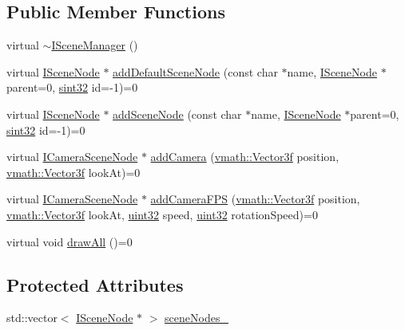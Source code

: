 \subsection*{Public Member Functions}
\begin{DoxyCompactItemize}
\item 
virtual \hyperlink{classicee_1_1engine_1_1ISceneManager_a0ce0427b8cfac77f1e520a5da7169a88}{$\sim$ISceneManager} ()
\item 
virtual \hyperlink{classicee_1_1engine_1_1ISceneNode}{ISceneNode} $\ast$ \hyperlink{classicee_1_1engine_1_1ISceneManager_afc84d5f887e850807ee36732b13c3798}{addDefaultSceneNode} (const char $\ast$name, \hyperlink{classicee_1_1engine_1_1ISceneNode}{ISceneNode} $\ast$parent=0, \hyperlink{namespacecompatibility_afc3ea6dfbdda98c9d2615b235b140a18}{sint32} id=-\/1)=0
\item 
virtual \hyperlink{classicee_1_1engine_1_1ISceneNode}{ISceneNode} $\ast$ \hyperlink{classicee_1_1engine_1_1ISceneManager_aecda2ddc8edc12f6bcf63575d988f0f1}{addSceneNode} (const char $\ast$name, \hyperlink{classicee_1_1engine_1_1ISceneNode}{ISceneNode} $\ast$parent=0, \hyperlink{namespacecompatibility_afc3ea6dfbdda98c9d2615b235b140a18}{sint32} id=-\/1)=0
\item 
virtual \hyperlink{classicee_1_1engine_1_1ICameraSceneNode}{ICameraSceneNode} $\ast$ \hyperlink{classicee_1_1engine_1_1ISceneManager_a2f43eae86d27ee9fd4d8964c7073cc9b}{addCamera} (\hyperlink{classvmath_1_1Vector3f}{vmath::Vector3f} position, \hyperlink{classvmath_1_1Vector3f}{vmath::Vector3f} lookAt)=0
\item 
virtual \hyperlink{classicee_1_1engine_1_1ICameraSceneNode}{ICameraSceneNode} $\ast$ \hyperlink{classicee_1_1engine_1_1ISceneManager_a2165f1d59e5338aa9fd89d0242a38662}{addCameraFPS} (\hyperlink{classvmath_1_1Vector3f}{vmath::Vector3f} position, \hyperlink{classvmath_1_1Vector3f}{vmath::Vector3f} lookAt, \hyperlink{namespacecompatibility_a51e8fe2956b4f39fe1fae96cec0d8393}{uint32} speed, \hyperlink{namespacecompatibility_a51e8fe2956b4f39fe1fae96cec0d8393}{uint32} rotationSpeed)=0
\item 
virtual void \hyperlink{classicee_1_1engine_1_1ISceneManager_a39930cf34881d0d014b41190dd356def}{drawAll} ()=0
\end{DoxyCompactItemize}
\subsection*{Protected Attributes}
\begin{DoxyCompactItemize}
\item 
std::vector$<$ \hyperlink{classicee_1_1engine_1_1ISceneNode}{ISceneNode} $\ast$ $>$ \hyperlink{classicee_1_1engine_1_1ISceneManager_abe2884dbf5f8bb733e4eabcc92922963}{sceneNodes\_\-}
\end{DoxyCompactItemize}


